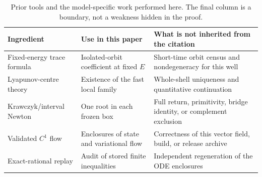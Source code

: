 \begin{table}[t]
\centering
\caption{Prior tools and the model-specific work performed here.  The final
column is a boundary, not a weakness hidden in the proof.}
\label{tab:prior-boundary}
\small
\begin{tabular}{@{}p{}p{}p{}@{}}
\toprule
Ingredient & Use in this paper & What is not inherited from the citation\\
\midrule
Fixed-energy trace formula & Isolated-orbit coefficient at fixed \(E\) &
Short-time orbit census and nondegeneracy for this well\\
Lyapunov-centre theory & Existence of the fast local family &
Whole-shell uniqueness and quantitative continuation\\
Krawczyk/interval Newton & One root in each frozen box &
Full return, primitivity, bridge identity, or complement exclusion\\
Validated \(C^1\) flow & Enclosures of state and variational flow &
Correctness of this vector field, build, or release archive\\
Exact-rational replay & Audit of stored finite inequalities &
Independent regeneration of the ODE enclosures\\
\bottomrule
\end{tabular}
\end{table}
